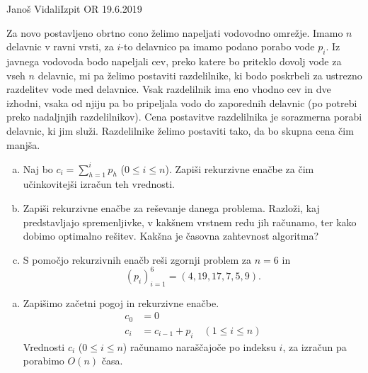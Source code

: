 \begin{naloga}{Janoš Vidali}{Izpit OR 19.6.2019}
\begin{vprasanje}
Za novo postavljeno obrtno cono želimo napeljati vodovodno omrežje.
Imamo $n$ delavnic v ravni vrsti,
za $i$-to delavnico pa imamo podano porabo vode $p_i$.
Iz javnega vodovoda bodo napeljali cev,
preko katere bo priteklo dovolj vode za vseh $n$ delavnic,
mi pa želimo postaviti razdelilnike,
ki bodo poskrbeli za ustrezno razdelitev vode med delavnice.
Vsak razdelilnik ima eno vhodno cev in dve izhodni,
vsaka od njiju pa bo pripeljala vodo do zaporednih delavnic
(po potrebi preko nadaljnjih razdelilnikov).
Cena postavitve razdelilnika je sorazmerna porabi delavnic, ki jim služi.
Razdelilnike želimo postaviti tako, da bo skupna cena čim manjša.

\begin{enumerate}[(a)]
\item Naj bo $c_i = \sum_{h=1}^i p_h$ ($0 \le i \le n$).
Zapiši rekurzivne enačbe za čim učinkovitejši izračun teh vrednosti.

\item Zapiši rekurzivne enačbe za reševanje danega problema.
Razloži, kaj pred\-stav\-lja\-jo spremenljivke,
v kakšnem vrstnem redu jih računamo, ter kako dobimo optimalno rešitev.
Kakšna je časovna zahtevnost algoritma?

\item S pomočjo rekurzivnih enačb reši zgornji problem za $n = 6$ in
$$
(p_i)_{i=1}^6 = (4, 19, 17, 7, 5, 9).
$$
\end{enumerate}
%
\begin{slika}
\pgfslika
{}
\end{slika}
\end{vprasanje}

\begin{odgovor}
\begin{enumerate}[(a)]
\item Zapišimo začetni pogoj in rekurzivne enačbe.
\begin{align*}
c_0 &= 0 \\
c_i &= c_{i-1} + p_i \quad (1 \le i \le n)
\end{align*}
Vrednosti $c_i$ ($0 \le i \le n$) računamo naraščajoče po indeksu $i$,
za izračun pa porabimo $O(n)$ časa.


\end{enumerate}
\end{odgovor}
\end{naloga}

